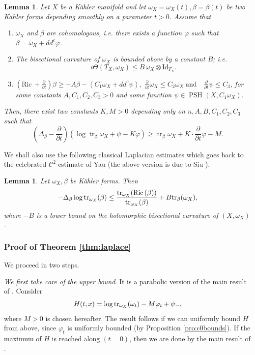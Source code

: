 \documentclass[a4paper,11pt,leqno,english]{smfart}
\theoremstyle{plain}
\theoremstyle{plain}
\numberwithin{equation}{section} %
\numberwithin{figure}{section} %
\theoremstyle{plain}
\theoremstyle{plain}
\newtheorem{lem}[thm]{Lemma} %
\theoremstyle{remark}
\theoremstyle{remark}
\theoremstyle{definition}
\theoremstyle{plain}
\theoremstyle{plain}
\theoremstyle{definition}
\newcommand{\om}{\omega}
\newcommand{\f}{\varphi}
\newcommand{\p}{\psi}
\newcommand{\Ric}{\mathrm{Ric} \,}
\renewcommand{\ge}{\geq}
\renewcommand{\le}{\leq}
\newcommand{\tr}{\operatorname{tr}}
\newcommand{\PSH}{\operatorname{PSH}}
\begin{document}
\begin{lem} \label{lem:chernlupara}
 Let $X$ be a Kähler manifold and let $\omega_X=\omega_X(t),\beta=\beta(t)$ be two Kähler forms depending smoothly on a parameter $t>0$. Assume that
 \begin{enumerate}
 \item $\om_X$ and $\beta$ are cohomologous, i.e. there exists a function $\varphi$ such that $\beta=\om_X+dd^c \varphi$.
 \item The bisectional curvature of $\om_X$ is bounded above by a constant $B$; i.e. 
 $$i\Theta(T_X,\om_X) \le B \, \om_X \otimes \mathrm{Id}_{T_X}.$$
 \item 
$ (\Ric +\frac{\partial}{\partial t})\beta \ge - A \beta-(C_1\om_X+dd^c \psi), \; \frac{\partial}{\partial t}\om_X \le C_2 \om_X \; \mbox{and} \quad \frac{\partial}{\partial t}\psi \le C_3$,
for some constants $A,C_1,C_2,C_3>0$ and some function $\psi \in \PSH(X,C_1\om_X)$.
 \end{enumerate}
 Then, there exist two constants $K,M>0$ depending only on $n,A,B,C_1,C_2,C_3$ such that
 \[ (\Delta_{\beta}-\frac{\partial}{\partial t})( \log \tr_{\beta}\om_X+\psi-K\varphi) \ge\tr_\beta\om_X +K \cdot \frac{\partial}{\partial t}\varphi-M.\]
 \end{lem}


We shall also use the following classical Laplacian estimates
which goes back to the celebrated ${\mathcal C}^2$-estimate of Yau \cite{Yau78}
(the above version is due to Siu \cite{Siu87}). 

\begin{lem} \label{lem:siu}
Let $\omega_X,\beta$ be K\"ahler forms. Then
$$
-\Delta_{\beta} \log {\rm tr}_{\omega_X}(\beta) \leq 
\frac{{\rm tr}_{\omega_X}(\Ric(\beta))}{{\rm tr}_{\omega_X}(\beta)}+B {\rm tr}_{\beta}(\omega_X),
$$
where $-B$ is a lower bound on the holomorphic bisectional curvature of $(X,\omega_X)$.
\end{lem}
 
 
 
 
 \subsubsection{Proof of Theorem \ref{thm:laplace}}
 We proceed in two steps. 
 
 \medskip

{\it We first take care of the upper bound}. 
It is a parabolic version of the main result of \cite{Pau08}.
Consider 
$$
H(t,x)=\log {\rm tr}_{\omega_X}(\omega_t)-M \f_t+\p_-,
$$
where $M>0$ is chosen hereafter.
The result follows if we can uniformly bound $H$ from above, since $\f_t$ is uniformly bounded
(by Proposition \ref{pro:c0bounds}).
If the maximum of $H$ is reached along $(t=0)$, then
we are done by the main result of \cite{Pau08}.
\end{document}
